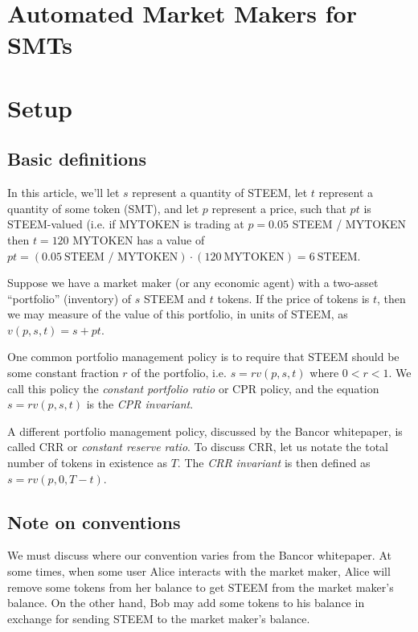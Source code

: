 \documentclass{article}
\begin{document}
\section{Automated Market Makers for SMTs}

\section{Setup}

\subsection{Basic definitions}

In this article, we'll let $s$ represent a quantity of STEEM, let $t$
represent a quantity of some token (SMT), and let $p$ represent a price,
such that $pt$ is STEEM-valued (i.e. if MYTOKEN is trading at
$p = 0.05$ STEEM / MYTOKEN then $t = 120$ MYTOKEN has a value of
$pt = (0.05\ \mbox{STEEM / MYTOKEN}) \cdot (120\ \mbox{MYTOKEN}) = 6\ \mbox{STEEM}$.

Suppose we have a market maker (or any economic agent) with a two-asset
``portfolio'' (inventory) of $s$ STEEM and $t$ tokens.  If the price of
tokens is $t$, then we may measure of the value of this portfolio, in
units of STEEM, as $v(p, s, t) = s + pt$.

One common portfolio management policy is to require that STEEM
should be some constant fraction $r$ of the portfolio, i.e.
$s = r v(p, s, t)$ where $0 < r < 1$.  We call this policy the
\textit{constant portfolio ratio} or CPR policy, and the equation
$s = r v(p, s, t)$ is the \textit{CPR invariant}.

A different portfolio management policy, discussed by the Bancor
whitepaper, is called CRR or \textit{constant reserve ratio}.  To discuss CRR,
let us notate the total number of tokens in existence as $T$.  The
\textit{CRR invariant} is then defined as $s = r v(p, 0, T-t)$.

\subsection{Note on conventions}

We must discuss where our convention varies from the Bancor whitepaper.
At some times, when some user Alice interacts with the market maker,
Alice will remove some tokens from her balance to get STEEM from
the market maker's balance.  On the other hand, Bob may add some tokens
to his balance in exchange for sending STEEM to the market maker's balance.
\end{document}
